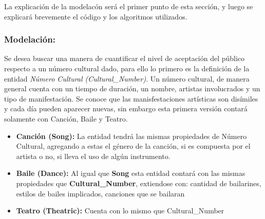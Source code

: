 \documentclass{article}
\begin{document}
La explicaci\'on de la modelac\'on ser\'a el primer punto de esta secci\'on, y luego se explicar\'a 
brevemente el c\'odigo y los algoritmos utilizados.

\subsubsection*{Modelaci\'on:}
Se desea buscar una manera de cuantificar el nivel de aceptaci\'on del p\'ublico respecto a un n\'umero 
cultural dado, para ello lo primero es la definici\'on de la entidad \textit{N\'umero Cultural (Cultural_Number)}. Un n\'umero cultural,
de manera general cuenta con un tiempo de duraci\'on, un nombre, artistas involucrados y un tipo de manifestaci\'on. Se conoce
que las manisfestaciones art\'isticas son dis\'imiles y cada d\'ia pueden aparecer nuevas, sin embargo esta 
primera versi\'on contar\'a solamente con Canci\'on, Baile y Teatro. 
\begin{itemize}
    \item \textbf{Canci\'on (Song): } La entidad tendr\'a las mismas propiedades de N\'umero Cultural, agregando a estas
    el g\'enero de la canci\'on, si es compuesta por el artista o no, si lleva el uso de alg\'un instrumento.
    \item \textbf{Baile (Dance): } Al igual que \textbf{Song} esta entidad contar\'a con las mismas propiedades que \textbf{Cultural_Number},
    extiendose con: cantidad de bailarines, estilos de bailes implicados, canciones que se bailaran
    \item \textbf{Teatro (Theatric): } Cuenta con lo mismo que Cultural_Number
\end{itemize}
\end{document}
